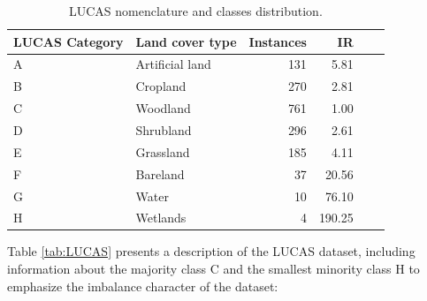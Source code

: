 \documentclass[remotesensing,article,submit,moreauthors,pdftex]{Definitions/mdpi}
\begin{document}
\begin{table}[H]
	\centering
	\begin{tabular}{llrrrr}
		\toprule
		\textbf{LUCAS Category} & \textbf{Land cover type} & \textbf{Instances}
		                        & \textbf{IR}                                   \\
		\hline
		A                       & Artificial land          & 131
		                        & 5.81                                          \\
		B                       & Cropland                 & 270
		                        & 2.81                                          \\
		C                       & Woodland                 & 761
		                        & 1.00                                          \\
		D                       & Shrubland                & 296
		                        & 2.61                                          \\
		E                       & Grassland                & 185
		                        & 4.11                                          \\
		F                       & Bareland                 & 37
		                        & 20.56                                         \\
		G                       & Water                    & 10
		                        & 76.10                                         \\
		H                       & Wetlands                 & 4
		                        & 190.25                                        \\
		\bottomrule
	\end{tabular}
	\caption{\label{tab:classes_distribution}LUCAS nomenclature and classes
		distribution.}
\end{table}

Table \ref{tab:LUCAS} presents a description of the LUCAS dataset, including
information about the majority class C and the smallest minority class H to
emphasize the imbalance character of the dataset:

\end{document}
